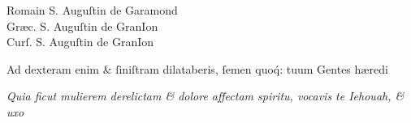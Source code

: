 \documentclass{article}
\newcommand{\threecolumntypefacenames}[3]{\begin{multicols}{3}
		\tiny
		\hfill \qquad \qquad \qquad \qquad #1\hspace*{\fill}\\
		\columnbreak
		\hfill #2\hspace*{\fill}\\
		\columnbreak
		\hfill #3\qquad \qquad \qquad \qquad \hspace*{\fill}
\end{multicols}}
\newcommand{\greektext}{ϖςηλϑεν αὐτώ ο ἐκατον ζαϱχος, παρακαλων αυτον ϗ λἐγων,Κυε ο παις μβὲβλη }
\begin{document}
\vspace{-3\baselineskip}
\threecolumntypefacenames{Romain S. Auguſtin de Garamond}{Gr\ae{}c. S. Auguſtin de GranIon\quad\quad\quad\quad\quad\quad\quad\quad\quad\quad\quad}{Curſ. S. Auguſtin de GranIon}
\vspace{-2\baselineskip}
\begin{multicols}{2}
	\fontsize{8}{9}\selectfont
	\justifying
	\noindent \quad Ad dexteram enim \& ſiniſtram dilataberis, ſemen quo\'q: tuum Gentes h\ae{}redi\linebreak

	\columnbreak
	\fontsize{8}{9}\selectfont
	\justifying
	\noindent
	\textit{Quia ficut mulierem derelictam \& dolore affectam spiritu, vocavis te Iehouah, \& uxo\linebreak}
\end{multicols}
\fontsize{8}{9}\selectfont
\vspace{-2.3\baselineskip}
\end{document}
